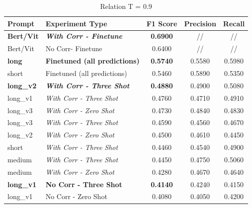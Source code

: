 \documentclass[letterpaper,journal]{IEEEtran}
\begin{document}
\begin{table}[!t]
\centering
\caption{Relation T = 0.9}
\label{tab:pixtral_relations_09}
\begin{tabular}{l|l|c|c|c}
\textbf{Prompt}   & \textbf{Experiment Type}                 & \textbf{F1 Score} & \textbf{Precision} & \textbf{Recall} \\ \hline
\textbf{Bert/Vit} & \textit{\textbf{With Corr - Finetune}}   & \textbf{0.6900}   & //                 & //              \\
Bert/Vit          & No Corr- Finetune                        & 0.6400            & //                 & //              \\
\textbf{long}     & \textbf{Finetuned (all predictions)}     & \textbf{0.5740}   & 0.5580             & 0.5980          \\
short             & Finetuned (all predictions)              & 0.5460            & 0.5890             & 0.5350          \\
\textbf{long\_v2} & \textit{\textbf{With Corr - Three Shot}} & \textbf{0.4880}   & 0.4900             & 0.5080          \\
long\_v1          & \textit{With Corr - Three Shot}          & 0.4760            & 0.4710             & 0.4910          \\
long\_v3          & \textit{With Corr - Zero Shot}           & 0.4730            & 0.4840             & 0.4830          \\
long\_v3          & \textit{With Corr - Three Shot}          & 0.4590            & 0.4560             & 0.4670          \\
long\_v2          & \textit{With Corr - Zero Shot}           & 0.4500            & 0.4610             & 0.4450          \\
short             & \textit{With Corr - Three Shot}          & 0.4460            & 0.4540             & 0.4900          \\
medium            & \textit{With Corr - Three Shot}          & 0.4450            & 0.4750             & 0.5060          \\
medium            & \textit{With Corr - Zero Shot}           & 0.4280            & 0.4670             & 0.4640          \\
\textbf{long\_v1} & \textbf{No Corr - Three Shot}            & \textbf{0.4140}   & 0.4240             & 0.4150          \\
long\_v1          & No Corr - Zero Shot                      & 0.4080            & 0.4050             & 0.4200          \\

\end{tabular}
\end{table}
\end{document}
